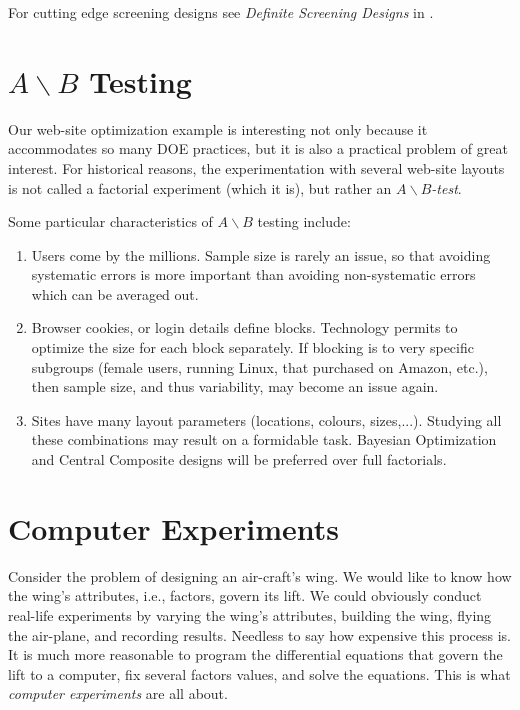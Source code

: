 \begin{extra}
For cutting edge screening designs see \emph{Definite Screening Designs} in \cite{jones_class_2011}.
\end{extra}



\section[AB testing]{$A\backslash B$ Testing}
Our web-site optimization example is interesting not only because it accommodates so many DOE practices, but it is also a practical problem of great interest.
For historical reasons, the experimentation with several web-site layouts is not called a factorial experiment (which it is), but rather an \emph{$A\backslash B$-test}.

Some particular characteristics of $A\backslash B$ testing include:
\begin{enumerate}
\item Users come by the millions. Sample size is rarely an issue, so that avoiding systematic errors is more important than avoiding non-systematic errors which can be averaged out.
\item Browser cookies, or login details define blocks. Technology permits to optimize the size for each block separately. If blocking is to very specific subgroups (female users, running Linux, that purchased on Amazon, etc.), then sample size, and thus variability, may become an issue again.
\item Sites have many layout parameters (locations, colours, sizes,...). Studying all these combinations may result on a formidable task. Bayesian Optimization and Central Composite designs will be preferred over full factorials. 
\end{enumerate}




\section{Computer Experiments}
\begin{example}
\label{eg:wings}
Consider the problem of designing an air-craft's wing.
We would like to know how the wing's attributes, i.e., factors, govern its lift.
We could obviously conduct real-life experiments by varying the wing's attributes, building the wing, flying the air-plane, and recording results. 
Needless to say how expensive this process is.
It is much more reasonable to program the differential equations that govern the lift to a computer, fix several factors values, and solve the equations.
This is what \emph{computer experiments} are all about. 
\end{example}


